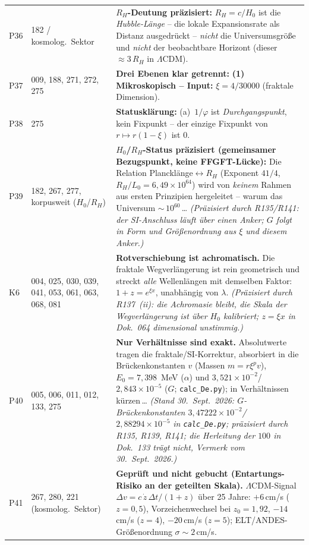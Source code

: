 \begin{longtable}{@{}p{0.9cm}p{3.1cm}p{10.2cm}@{}}
P36 & 182 / kosmolog.\ Sektor & \textbf{$R_H$-Deutung präzisiert:} $R_H = c/H_0$ ist die \emph{Hubble-Länge} -- die lokale Expansionsrate als Distanz ausgedrückt -- \emph{nicht} die Universumsgröße und \emph{nicht} der beobachtbare Horizont (dieser $\approx 3\,R_H$ in $\Lambda$CDM). \\
P37 & 009, 188, 271, 272, 275 & \textbf{Drei Ebenen klar getrennt:} \newline \textbf{(1) Mikroskopisch -- Input:} $\xi = 4/30000$ (fraktale Dimension). \\
P38 & 275 & \textbf{Statusklärung:} (a)~$1/\varphi$ ist \emph{Durchgangspunkt}, kein Fixpunkt -- der einzige Fixpunkt von $r\mapsto r(1-\xi)$ ist $0$. \\
P39 & 182, 267, 277, korpusweit ($H_0$/$R_H$) & \textbf{$H_0$/$R_H$-Status präzisiert (gemeinsamer Bezugspunkt, keine FFGFT-Lücke):} Die Relation Plancklänge$\leftrightarrow R_H$ (Exponent $41/4$, $R_H/L_0 = 6{,}49\times10^{64}$) wird von \emph{keinem} Rahmen aus ersten Prinzipien hergeleitet -- warum das Universum $\sim$\,$10^{60}$\,\ldots{} \emph{(Präzisiert durch R135/R141: der SI-Anschluss läuft über einen Anker; $G$ folgt in Form und Größenordnung aus $\xi$ und diesem Anker.)} \\
K6 & 004, 025, 030, 039, 041, 053, 061, 063, 068, 081 & \textbf{Rotverschiebung ist achromatisch.} Die fraktale Wegverlängerung ist rein geometrisch und streckt \emph{alle} Wellenlängen mit demselben Faktor: $1+z=e^{\xi x}$, unabhängig von $\lambda$. \emph{(Präzisiert durch R137~(ii): die Achromasie bleibt, die Skala der Wegverlängerung ist über $H_0$ kalibriert; $z=\xi x$ in Dok.~064 dimensional unstimmig.)} \\
P40 & 005, 006, 011, 012, 133, 275 & \textbf{Nur Verhältnisse sind exakt.} Absolutwerte tragen die fraktale/SI-Korrektur, absorbiert in die Brückenkonstanten $v$ (Massen $m=r\xi^p v$), $E_0=7{,}398$~MeV ($\alpha$) und $3{,}521\times10^{-2}$/$2{,}843\times10^{-5}$ ($G$; \texttt{calc\_De.py}); in Verhältnissen kürzen\,\ldots{} \emph{(Stand 30.~Sept.~2026: $G$-Brückenkonstanten $3{,}47222\times10^{-2}$/$2{,}88294\times10^{-5}$ in \texttt{calc\_De.py}; präzisiert durch R135, R139, R141; die Herleitung der $100$ in Dok.~133 trägt nicht, Vermerk vom 30.~Sept.~2026.)} \\
P41 & 267, 280, 221 (kosmolog.\ Sektor) & \textbf{Geprüft und nicht gebucht (Entartungs-Risiko an der geteilten Skala).} $\Lambda$CDM-Signal $\Delta v=c\,\dot z\,\Delta t/(1+z)$ über 25 Jahre: $+6$\,cm/s ($z{=}0{,}5$), Vorzeichenwechsel bei $z_0=1{,}92$, $-14$\,cm/s ($z{=}4$), $-20$\,cm/s ($z{=}5$); ELT/ANDES-Größenordnung $\sigma\sim2$\,cm/s. \\

\end{longtable}
